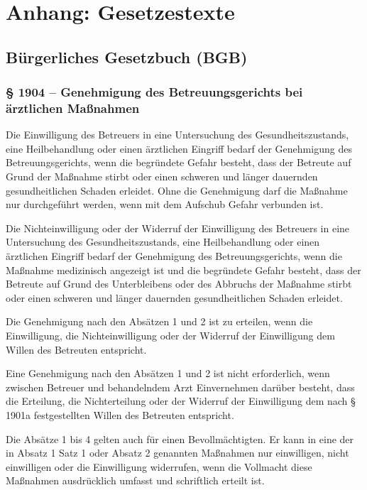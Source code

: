 



\newpage

\section*{Anhang: Gesetzestexte}


\subsection*{Bürgerliches Gesetzbuch (BGB)}


\subsubsection*{§ 1904 -- Genehmigung des Betreuungsgerichts bei ärztlichen Maßnahmen}

\begin{legal}

\item Die Einwilligung des Betreuers in eine Untersuchung des Gesundheitszustands, eine Heilbehandlung oder einen ärztlichen Eingriff bedarf der Genehmigung des Betreuungsgerichts, wenn die begründete Gefahr besteht, dass der Betreute auf Grund der Maßnahme stirbt oder einen schweren und länger dauernden gesundheitlichen Schaden erleidet. Ohne die Genehmigung darf die Maßnahme nur durchgeführt werden, wenn mit dem Aufschub Gefahr verbunden ist.

\item Die Nichteinwilligung oder der Widerruf der Einwilligung des Betreuers in eine Untersuchung des Gesundheitszustands, eine Heilbehandlung oder einen ärztlichen Eingriff bedarf der Genehmigung des Betreuungsgerichts, wenn die Maßnahme medizinisch angezeigt ist und die begründete Gefahr besteht, dass der Betreute auf Grund des Unterbleibens oder des Abbruchs der Maßnahme stirbt oder einen schweren und länger dauernden gesundheitlichen Schaden erleidet.

\item Die Genehmigung nach den Absätzen 1 und 2 ist zu erteilen, wenn die Einwilligung, die Nichteinwilligung oder der Widerruf der Einwilligung dem Willen des Betreuten entspricht.

\item Eine Genehmigung nach den Absätzen 1 und 2 ist nicht erforderlich, wenn zwischen Betreuer und behandelndem Arzt Einvernehmen darüber besteht, dass die Erteilung, die Nichterteilung oder der Widerruf der Einwilligung dem nach § 1901a festgestellten Willen des Betreuten entspricht.

\item Die Absätze 1 bis 4 gelten auch für einen Bevollmächtigten. Er kann in eine der in Absatz 1 Satz 1 oder Absatz 2 genannten Maßnahmen nur einwilligen, nicht einwilligen oder die Einwilligung widerrufen, wenn die Vollmacht diese Maßnahmen ausdrücklich umfasst und schriftlich erteilt ist.

\end{legal}



